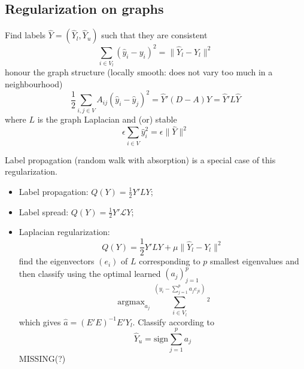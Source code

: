 \documentclass[a4paper]{article}
\newcommand{\Lcal}{\mathcal{L}}
\newcommand{\argmax}{\mathop{\text{argmax}}}
\begin{document}
\subsection{Regularization on graphs} %
\label{sub:regularization_on_graphs}

Find labels $\hat{Y} = (\hat{Y}_l, \hat{Y}_u)$ such that they are consistent
\[
\sum_{i\in V_l} (\hat{y}_i - y_i)^2 = \| \hat{Y}_l - Y_l\|^2
\]
honour the graph structure (locally smooth: does not vary too much in a neighbourhood)
\[
\frac{1}{2} \sum_{i,j\in V} A_{ij} (\hat{y}_i - \hat{y}_j)^2
= \hat{Y}'(D-A)\hat{Y}
= \hat{Y}' L \hat{Y}
\]
where $L$ is the graph Laplacian and (or) stable
\[
\epsilon \sum_{i\in V} \hat{y}_i^2 = \epsilon \|\hat{Y}\|^2
\]

Label propagation (random walk with absorption) is a special case of this regularization.
\begin{itemize}
	\item Label propagation: $ Q(Y) = \frac{1}{2} Y'L Y $;
	\item Label spread: $ Q(Y) = \frac{1}{2} Y'\Lcal Y $;
	\item Laplacian regularization: 
	\[ Q(Y) = \frac{1}{2} Y' L Y + \mu \|\hat{Y}_l - Y_l\|^2 \]
	find the eigenvectors $(e_i)$ of $L$ corresponding to $p$ smallest eigenvalues and then
	classify using the optimal learned $(a_j)_{j=1}^p$
	\[ \argmax_{a_j} \sum_{i\in V_l}^ (y_i - \sum_{j=1}^p a_j e_{ji})^2\]
	which gives $\hat{a} = (E'E)^{-1} E'Y_l$. Classify according to
	\[\hat{Y}_u = \text{sign} \sum_{j=1}^p a_j \]
	MISSING(?)
\end{itemize}




\end{document}
